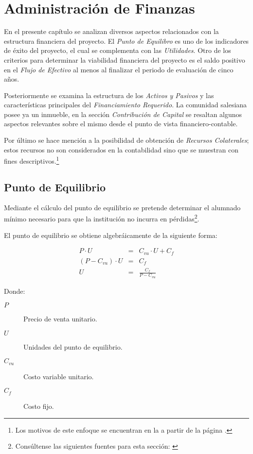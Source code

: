 \chapter{Administración de Finanzas}
\label{cap:Admin:Finanzas}

En el presente capítulo se analizan diversos aspectos relacionados con la estructura financiera del proyecto. El \emph{Punto de Equilibro} es uno de los indicadores de éxito del proyecto, el cual se complementa con las \emph{Utilidades}. Otro de los criterios para determinar la viabilidad financiera del proyecto es el saldo positivo en el \emph{Flujo de Efectivo} al menos al finalizar el periodo de evaluación de cinco años.

Posteriormente se examina la estructura de los \emph{Activos y Pasivos} y las características principales del \emph{Financiamiento Requerido}. La comunidad salesiana posee ya un inmueble, en la sección \emph{Contribución de Capital} se resaltan algunos aspectos relevantes sobre el mismo desde el punto de vista financiero-contable.

Por último se hace mención a la posibilidad de obtención de \emph{Recursos Colaterales}; estos recursos no son considerados en la contabilidad sino que se muestran con fines descriptivos.\footnote{Los motivos de este enfoque se encuentran en la  a partir de la página \pageref{ch:Introduccion}.}

\section{Punto de Equilibrio}

Mediante el cálculo del punto de equilibrio se pretende determinar el alumnado mínimo necesario para que la institución no incurra en pérdidas\footnote{Consúltense las siguientes fuentes para esta sección: \citep{Van2003fundamentos, novoa2008finanzas, bodie2003finanzas}}.

El punto de equilibrio se obtiene algebráicamente de la siguiente forma:

$$
	\begin{array}{rcl}
		P \cdot U &=& C_{vu} \cdot U + C_f \\
		\left( P - C_{vu} \right) \cdot U &=& C_f \\
		U &=& \frac{C_f}{P - C_{vu}}
	\end{array}
$$

Donde:

\begin{description}
	\item[$P$] Precio de venta unitario.
	\item[$U$] Unidades del punto de equilibrio.
	\item[$C_{vu}$] Costo variable unitario.
	\item[$C_f$] Costo fijo.
\end{description}

